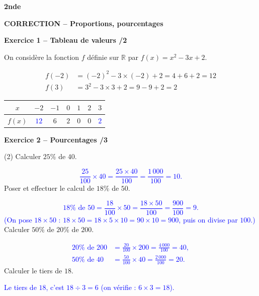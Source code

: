 \documentclass[10pt,a4paper]{article}
\renewcommand{\niveau}{2nde}
\renewcommand{\chapitre}{Proportions, pourcentages}
\renewcommand{\interroversion}[1]{
    \noindent\textbf{\niveau}

    \vspace{-0.5cm}
    \begin{center}
        \textbf{\large CORRECTION -- \chapitre}
    \end{center}

    \vspace{0.1cm}
}
\begin{document}
\newpage


\interroversion{C}

\textbf{Exercice 1 -- Tableau de valeurs \hfill /2}

On considère la fonction \(f\) définie sur \(\mathbb{R}\) par \(f(x)=x^2-3x+2\).

\[
\begin{aligned}
f(-2) &= (-2)^2-3\times(-2)+2 = 4+6+2 = 12\\
f(3)  &= 3^2-3\times 3+2 = 9-9+2 = 2
\end{aligned}
\]

\begin{center}
    \renewcommand{\arraystretch}{1.5}
    \setlength{\tabcolsep}{0.25cm}
    \begin{tabular}{|*{7}{c|}}
    \hline
    \(x\) & \(-2\) & \(-1\) & \(0\) & \(1\) & \(2\) & \(3\) \\
    \hline
    \(f(x)\) & \textcolor{blue}{\(12\)} & \(6\) & \(2\) & \(0\) & \(0\) & \textcolor{blue}{\(2\)} \\
    \hline
    \end{tabular}
\end{center}

\textbf{Exercice 2 -- Pourcentages \hfill /3}

\begin{tasks}(2)
    \task Calculer \(25\%\) de \(40\).

    \textcolor{blue}{
    \[
    \frac{25}{100}\times 40 = \frac{25\times 40}{100} = \frac{1\,000}{100} = 10.
    \]}
    \task Poser et effectuer le calcul de \(18\%\) de \(50\).

    \textcolor{blue}{
    \[
    18\%\text{ de }50 = \frac{18}{100}\times 50 = \frac{18\times 50}{100} = \frac{900}{100} = 9.
    \]
    (On pose \(18\times50\) : \(18\times50=18\times5\times10=90\times10=900\), puis on divise par \(100\).)}
    \task Calculer \(50\%\) de \(20\%\) de \(200\).

    \textcolor{blue}{
    \[
    \begin{aligned}
    20\%\text{ de }200 &=\frac{20}{100}\times200=\frac{4\,000}{100}=40,\\
    50\%\text{ de }40 &=\frac{50}{100}\times40=\frac{2\,000}{100}=20.
    \end{aligned}
    \]}
    \task Calculer le tiers de \(18\).

    \textcolor{blue}{Le tiers de \(18\), c'est \(18\div3=6\) (on vérifie : \(6\times3=18\)).}
\end{tasks}
\end{document}
